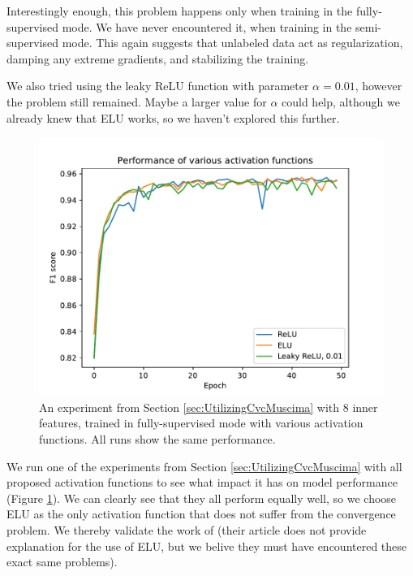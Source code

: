 Interestingly enough, this problem happens only when training in the fully-supervised mode. We have never encountered it, when training in the semi-supervised mode. This again suggests that unlabeled data act as regularization, damping any extreme gradients, and stabilizing the training.

We also tried using the leaky ReLU function with parameter $\alpha = 0.01$, however the problem still remained. Maybe a larger value for $\alpha$ could help, although we already knew that ELU works, so we haven't explored this further.

\begin{figure}[ht]
    \centering
    \includegraphics[width=140mm]{../../figures/03-activation-function/performance.pdf}
    \caption{An experiment from Section \ref{sec:UtilizingCvcMuscima} with 8 inner features, trained in fully-supervised mode with various activation functions. All runs show the same performance.}
    \label{fig:ActivationFunctionPerformances}
\end{figure}

We run one of the experiments from Section \ref{sec:UtilizingCvcMuscima} with all proposed activation functions to see what impact it has on model performance (Figure \ref{fig:ActivationFunctionPerformances}). We can clearly see that they all perform equally well, so we choose ELU as the only activation function that does not suffer from the convergence problem. We thereby validate the work of \cite{DorferEtAl} (their article does not provide explanation for the use of ELU, but we belive they must have encountered these exact same problems).



